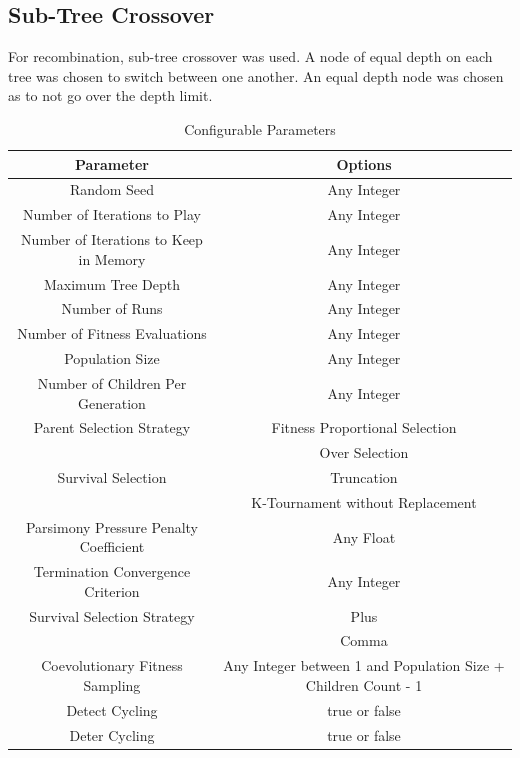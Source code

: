 \documentclass[times]{article}
\begin{document}
	\subsection{Sub-Tree Crossover}
	For recombination, sub-tree crossover was used. A node of equal depth on each tree was chosen to switch between one another. An equal depth node was chosen as to not go over the depth limit.

	\begin{table}
		\centering
		\caption{Configurable Parameters}
		\label{tab:config}
		\begin{tabular}{| c | c |}
			\hline
				\textbf{Parameter} & \textbf{Options} \\
				\hline
				Random Seed & Any Integer \\
				\hline
				Number of Iterations to Play & Any Integer \\
				\hline
				Number of Iterations to Keep in Memory & Any Integer \\
				\hline
				Maximum Tree Depth & Any Integer \\
				\hline
				Number of Runs & Any Integer \\
				\hline
				Number of Fitness Evaluations & Any Integer \\
				\hline
				Population Size & Any Integer \\
				\hline
				Number of Children Per Generation & Any Integer \\
				\hline
				Parent Selection Strategy 	& Fitness Proportional Selection \\
											& Over Selection \\
				\hline
				Survival Selection	& Truncation \\
									& K-Tournament without Replacement \\
				\hline
				Parsimony Pressure Penalty Coefficient & Any Float \\
				\hline
				Termination Convergence Criterion & Any Integer \\
				\hline
				Survival Selection Strategy 	& Plus \\
												& Comma \\
				\hline
				Coevolutionary Fitness Sampling	& Any Integer between 1 and Population Size + Children Count - 1 \\
				\hline
				Detect Cycling & true or false \\
				\hline
				Deter Cycling & true or false \\
			\hline
		\end{tabular}
	\end{table}
\end{document}

